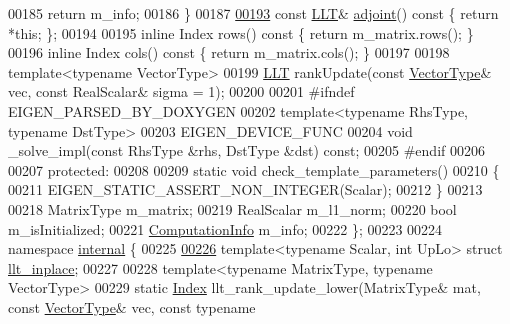 \begin{DoxyCode}
00185       \textcolor{keywordflow}{return} m\_info;
00186     \}
00187 
\hyperlink{group___cholesky___module_a559aba3a7c41f7fc87ec84327bb72ccd}{00193}     \textcolor{keyword}{const} \hyperlink{group___cholesky___module_class_eigen_1_1_l_l_t}{LLT}& \hyperlink{group___cholesky___module_a559aba3a7c41f7fc87ec84327bb72ccd}{adjoint}()\textcolor{keyword}{ const }\{ \textcolor{keywordflow}{return} *\textcolor{keyword}{this}; \};
00194 
00195     \textcolor{keyword}{inline} Index rows()\textcolor{keyword}{ const }\{ \textcolor{keywordflow}{return} m\_matrix.rows(); \}
00196     \textcolor{keyword}{inline} Index cols()\textcolor{keyword}{ const }\{ \textcolor{keywordflow}{return} m\_matrix.cols(); \}
00197 
00198     \textcolor{keyword}{template}<\textcolor{keyword}{typename} VectorType>
00199     \hyperlink{group___cholesky___module_class_eigen_1_1_l_l_t}{LLT} rankUpdate(\textcolor{keyword}{const} \hyperlink{struct_vector_type}{VectorType}& vec, \textcolor{keyword}{const} RealScalar& sigma = 1);
00200 
00201 \textcolor{preprocessor}{    #ifndef EIGEN\_PARSED\_BY\_DOXYGEN}
00202     \textcolor{keyword}{template}<\textcolor{keyword}{typename} RhsType, \textcolor{keyword}{typename} DstType>
00203     EIGEN\_DEVICE\_FUNC
00204     \textcolor{keywordtype}{void} \_solve\_impl(\textcolor{keyword}{const} RhsType &rhs, DstType &dst) \textcolor{keyword}{const};
00205 \textcolor{preprocessor}{    #endif}
00206 
00207   \textcolor{keyword}{protected}:
00208 
00209     \textcolor{keyword}{static} \textcolor{keywordtype}{void} check\_template\_parameters()
00210     \{
00211       EIGEN\_STATIC\_ASSERT\_NON\_INTEGER(Scalar);
00212     \}
00213 
00218     MatrixType m\_matrix;
00219     RealScalar m\_l1\_norm;
00220     \textcolor{keywordtype}{bool} m\_isInitialized;
00221     \hyperlink{group__enums_ga85fad7b87587764e5cf6b513a9e0ee5e}{ComputationInfo} m\_info;
00222 \};
00223 
00224 \textcolor{keyword}{namespace }\hyperlink{namespaceinternal}{internal} \{
00225 
\hyperlink{struct_eigen_1_1internal_1_1llt__inplace}{00226} \textcolor{keyword}{template}<\textcolor{keyword}{typename} Scalar, \textcolor{keywordtype}{int} UpLo> \textcolor{keyword}{struct }\hyperlink{struct_eigen_1_1internal_1_1llt__inplace}{llt\_inplace};
00227 
00228 \textcolor{keyword}{template}<\textcolor{keyword}{typename} MatrixType, \textcolor{keyword}{typename} VectorType>
00229 \textcolor{keyword}{static} \hyperlink{namespace_eigen_a62e77e0933482dafde8fe197d9a2cfde}{Index} llt\_rank\_update\_lower(MatrixType& mat, \textcolor{keyword}{const} \hyperlink{struct_vector_type}{VectorType}& vec, \textcolor{keyword}{const} \textcolor{keyword}{typename} 

\end{DoxyCode}
